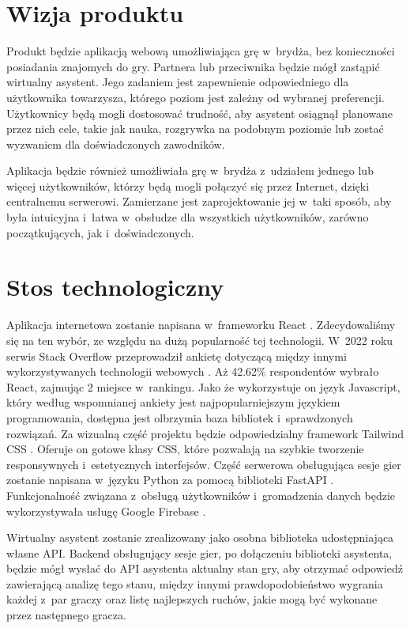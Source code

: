 \section{Wizja produktu}

Produkt będzie aplikacją webową umożliwiająca grę w~brydża,
bez konieczności posiadania znajomych do gry.
Partnera lub przeciwnika będzie mógł zastąpić wirtualny asystent.
Jego zadaniem jest zapewnienie odpowiedniego
dla użytkownika towarzysza, którego poziom jest zależny od wybranej
preferencji. Użytkownicy będą mogli dostosować trudność, aby asystent osiągnął
planowane przez nich cele, takie jak nauka, rozgrywka na podobnym poziomie
lub zostać wyzwaniem dla doświadczonych zawodników.

Aplikacja będzie również umożliwiała grę w~brydża z~udziałem jednego lub więcej użytkowników,
którzy będą mogli połączyć się przez Internet, dzięki centralnemu serwerowi.
Zamierzane jest zaprojektowanie jej w~taki sposób, aby była intuicyjna i~łatwa
w~obsłudze dla wszystkich użytkowników, zarówno początkujących, jak
i~doświadczonych.


\section{Stos technologiczny}

Aplikacja internetowa zostanie napisana w~frameworku React \cite{React}.
Zdecydowaliśmy się na ten wybór, ze względu na dużą popularność tej
technologii. W~2022 roku serwis Stack Overflow \cite{StackOverflow} przeprowadził ankietę dotyczącą między innymi wykorzystywanych technologii
webowych \cite{React-stack}. Aż 42.62\% respondentów wybrało React,
zajmując 2 miejsce w~rankingu. Jako że wykorzystuje on język Javascript,
który według wspomnianej ankiety jest najpopularniejszym językiem programowania,
dostępna jest olbrzymia baza bibliotek i~sprawdzonych rozwiązań. Za wizualną
część projektu będzie odpowiedzialny framework Tailwind CSS \cite{Tailwind}.
Oferuje on gotowe klasy CSS, które pozwalają na szybkie tworzenie responsywnych
i~estetycznych interfejsów. Część serwerowa obsługująca sesje gier zostanie
napisana w~języku Python \cite{Python} za pomocą biblioteki FastAPI
\cite{FastAPI}. Funkcjonalność związana z~obsługą użytkowników i~gromadzenia
danych będzie wykorzystywała usługę Google Firebase \cite{Firebase}.

Wirtualny asystent zostanie zrealizowany jako osobna biblioteka udostępniająca
własne API. Backend obsługujący sesje gier, po dołączeniu biblioteki asystenta,
będzie mógł wysłać do API asystenta aktualny stan gry, aby otrzymać
odpowiedź zawierającą analizę tego stanu, między innymi
prawdopodobieństwo wygrania każdej z~par graczy oraz listę
najlepszych ruchów, jakie mogą być wykonane przez następnego gracza.

